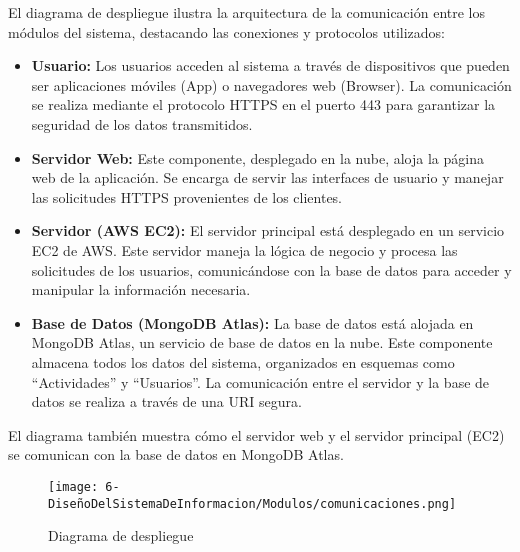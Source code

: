 El diagrama de despliegue ilustra la arquitectura de la comunicación entre los módulos del sistema, destacando las conexiones y protocolos utilizados:
\begin{itemize}
	\item \textbf{Usuario:} Los usuarios acceden al sistema a través de dispositivos que pueden ser aplicaciones móviles (App) o navegadores web (Browser). La comunicación se realiza mediante el protocolo HTTPS en el puerto 443 para garantizar la seguridad de los datos transmitidos.
	\item \textbf{Servidor Web:} Este componente, desplegado en la nube, aloja la página web de la aplicación. Se encarga de servir las interfaces de usuario y manejar las solicitudes HTTPS provenientes de los clientes.
	\item \textbf{Servidor (AWS EC2):} El servidor principal está desplegado en un servicio EC2 de AWS. Este servidor maneja la lógica de negocio y procesa las solicitudes de los usuarios, comunicándose con la base de datos para acceder y manipular la información necesaria.
	\item \textbf{Base de Datos (MongoDB Atlas):} La base de datos está alojada en MongoDB Atlas, un servicio de base de datos en la nube. Este componente almacena todos los datos del sistema, organizados en esquemas como “Actividades” y “Usuarios”. La comunicación entre el servidor y la base de datos se realiza a través de una URI segura.
\end{itemize}

El diagrama también muestra cómo el servidor web y el servidor principal (EC2) se comunican con la base de datos en MongoDB Atlas.

\begin{figure}[H]
	\centering
	\texttt{[image: 6-DiseñoDelSistemaDeInformacion/Modulos/comunicaciones.png]}
	\caption{Diagrama de despliegue}
\end{figure}